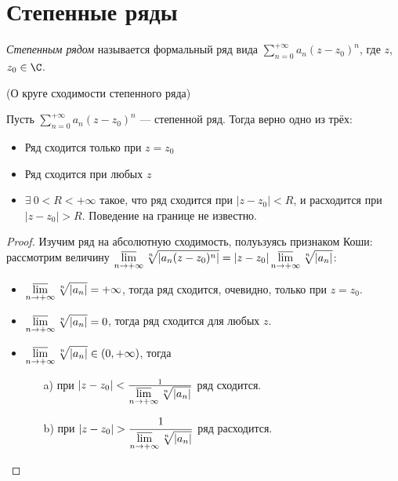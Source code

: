 \section{Степенные ряды}

\begin{definition}
    \textit{Степенным рядом} называется формальный ряд вида $\displaystyle
    \sum_{n = 0}^{+\infty}{a_n (z - z_0)^n}$, где $z$, $z_0 \in \C$.
\end{definition}

\begin{theorem}(О круге сходимости степенного ряда)

    Пусть $\displaystyle \sum_{n = 0}^{+\infty}{a_n (z - z_0)^n}$ ---
    степенной ряд. Тогда верно одно из трёх:
    \begin{itemize}
        \item Ряд сходится только при $z = z_0$
        \item Ряд сходится при любых $z$ \item $\exists~ 0 < R < +\infty$ такое, что ряд сходится при $|z -
        z_0| < R$, и расходится при $|z - z_0| > R$. Поведение на границе не
        известно.
    \end{itemize}
\end{theorem}
\begin{proof}
    Изучим ряд на абсолютную сходимость, полуьзуясь признаком Коши: рассмотрим
    величину $\displaystyle \varlimsup_{n \to +\infty}{\sqrt[n]{|a_n (z -
    z_0)^n|}} = |z - z_0| \varlimsup_{n \to +\infty}{\sqrt[n]{|a_n|}}$:
    \begin{itemize}
        \item $\displaystyle \varlimsup_{n \to +\infty}{\sqrt[n]{|a_n|}} =
        +\infty$,
        тогда ряд сходится, очевидно, только при $z = z_0$.
        \item $\displaystyle \varlimsup_{n \to +\infty}{\sqrt[n]{|a_n|}} = 0$,
        тогда ряд сходится для любых $z$.
        \item $\displaystyle \varlimsup_{n \to +\infty}{\sqrt[n]{|a_n|}} \in (0,
        +\infty)$, тогда
        \begin{itemize}
            \item[a)] при $|z - z_0| < \frac{1}{\displaystyle \varlimsup_{n \to
            +\infty}{\sqrt[n]{|a_n|}}}$ ряд сходится.
            \item[b)] при $\displaystyle|z - z_0| > \frac{1}{\displaystyle
            \varlimsup_{n \to +\infty}{\sqrt[n]{|a_n|}}}$ ряд расходится.
        \end{itemize}
    \end{itemize}
\end{proof}


